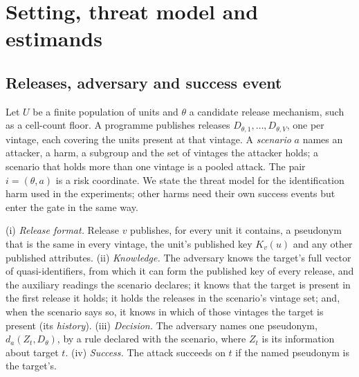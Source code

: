 \section{Setting, threat model and estimands}\label{sec:setting}
\subsection{Releases, adversary and success event}
Let $U$ be a finite population of units and $\theta$ a candidate release mechanism, such as a cell-count floor. A programme publishes releases $D_{\theta,1},\ldots,D_{\theta,V}$, one per vintage, each covering the units present at that vintage. A \emph{scenario} $a$ names an attacker, a harm, a subgroup and the set of vintages the attacker holds; a scenario that holds more than one vintage is a pooled attack. The pair $i=(\theta,a)$ is a risk coordinate. We state the threat model for the identification harm used in the experiments; other harms need their own success events but enter the gate in the same way.

\begin{assumption}\label{ass:threat}
(i) \emph{Release format.} Release $v$ publishes, for every unit it contains, a pseudonym that is the same in every vintage, the unit's published key $K_v(u)$ and any other published attributes. (ii) \emph{Knowledge.} The adversary knows the target's full vector of quasi-identifiers, from which it can form the published key of every release, and the auxiliary readings the scenario declares; it knows that the target is present in the first release it holds; it holds the releases in the scenario's vintage set; and, when the scenario says so, it knows in which of those vintages the target is present (its \emph{history}). (iii) \emph{Decision.} The adversary names one pseudonym, $d_a(Z_t,D_\theta)$, by a rule declared with the scenario, where $Z_t$ is its information about target $t$. (iv) \emph{Success.} The attack succeeds on $t$ if the named pseudonym is the target's.
\end{assumption}

